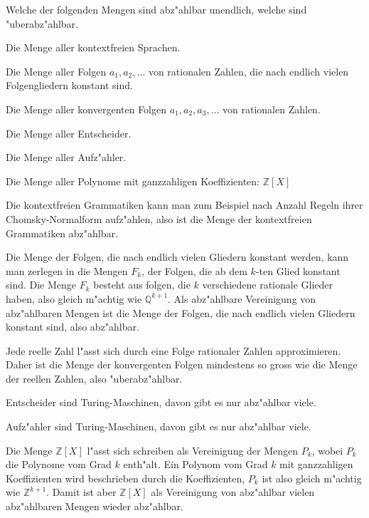 Welche der folgenden Mengen sind abz"ahlbar unendlich, welche sind
"uberabz"ahlbar.
\begin{teilaufgaben}
\item Die Menge aller kontextfreien Sprachen.
\item Die Menge aller Folgen $a_1,a_2,\dots$ von rationalen Zahlen,
die nach endlich vielen Folgengliedern konstant sind.
\item Die Menge aller konvergenten Folgen $a_1,a_2,a_3,\dots$ von
rationalen Zahlen.
\item Die Menge aller Entscheider.
\item Die Menge aller Aufz"ahler.
\item Die Menge aller Polynome mit ganzzahligen Koeffizienten:
${\mathbb Z}[X]$
\end{teilaufgaben}

\begin{loesung}
\begin{teilaufgaben}
\item Die kontextfreien Grammatiken kann man zum Beispiel nach
Anzahl Regeln ihrer Chomsky-Normalform aufz"ahlen, also ist
die Menge der kontextfreien Grammatiken abz"ahlbar.
\item Die Menge der Folgen, die nach endlich vielen Gliedern konstant
werden, kann man zerlegen in die Mengen $F_k$, der Folgen, die ab dem
$k$-ten Glied konstant sind. Die Menge $F_k$ besteht aus folgen, die
$k$ verschiedene rationale Glieder haben, also gleich m"achtig wie
$\mathbb Q^{k+1}$. Als abz"ahlbare Vereinigung von abz"ahlbaren Mengen
ist die Menge der Folgen, die nach endlich vielen Gliedern konstant sind,
also abz"ahlbar.
\item Jede reelle Zahl l"asst sich durch eine Folge rationaler Zahlen
approximieren. Daher ist die Menge der konvergenten Folgen mindestens
so gross wie die Menge der reellen Zahlen, also "uberabz"ahlbar.
\item Entscheider sind Turing-Maschinen, davon gibt es nur abz"ahlbar viele.
\item Aufz"ahler sind Turing-Maschinen, davon gibt es nur abz"ahlbar viele.
\item Die Menge ${\mathbb Z}[X]$ l"asst sich schreiben als Vereinigung
der Mengen $P_k$, wobei $P_k$ die Polynome vom Grad $k$ enth"alt.
Ein Polynom vom Grad $k$ mit ganzzahligen Koeffizienten wird beschrieben
durch die Koeffizienten, $P_k$ ist also gleich m"achtig wie $\mathbb Z^{k+1}$.
Damit ist aber ${\mathbb Z}[X]$ als Vereinigung von abz"ahlbar vielen
abz"ahlbaren Mengen wieder abz"ahlbar.
\qedhere
\end{teilaufgaben}
\end{loesung}

